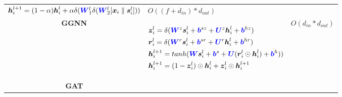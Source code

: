 \begin{table}
\begin{footnotesize}
\begin{tabular}{cp{20em}r}
            $\boldsymbol{h}_i^{l+1} = (1 - \alpha)  \boldsymbol{h}_i^l +\alpha    \delta(\textcolor{blue}{\boldsymbol{W}}^l_1 \delta(\textcolor{blue}{\boldsymbol{W}}^l_2 [\boldsymbol{x}_i \parallel \boldsymbol{s}_i^l]))$ &
            $O((f + d_{in}) * d_{out})$                                                                                                                                                                                        \\
            \textbf{GGNN}    \cite{li2015_ggnn}                                                                                                                                                                              &
            \begin{scriptsize}
                $\begin{aligned}[t]
                         & {\boldsymbol{z}}_i^l = \delta ( \textcolor{blue}{\boldsymbol{W}}^z \boldsymbol{s}_i^l + \textcolor{blue}{\boldsymbol{b}}^{sz} + \textcolor{blue}{\boldsymbol{U}}^z \boldsymbol{h}_i^{l} + \textcolor{blue}{\boldsymbol{b}}^{hz})                    \\
                         & \boldsymbol{r}_i^l = \delta ( \textcolor{blue}{\boldsymbol{W}}^r \boldsymbol{s}_i^l+ \textcolor{blue}{\boldsymbol{b}}^{sr} +\textcolor{blue}{\boldsymbol{U}}^r \boldsymbol{h}_i^{l} + \textcolor{blue}{\boldsymbol{b}}^{hr})                        \\
                         & \boldsymbol{h}_i^{l+1} = tanh ( \textcolor{blue}{\boldsymbol{W}} \boldsymbol{s}_i^l + \textcolor{blue}{\boldsymbol{b}}^s + \textcolor{blue}{\boldsymbol{U}} ( \boldsymbol{r}_i^l \odot \boldsymbol{h}_i^{l}) + \textcolor{blue}{\boldsymbol{b}}^h)) \\
                         & \boldsymbol{h}_i^{l+1} = (1 - {\boldsymbol{z}}_i^l) \odot \boldsymbol{h}_i^l + {\boldsymbol{z}}_i^l \odot \boldsymbol{h}_i^{l+1}
                    \end{aligned}$
            \end{scriptsize}
                                                                                                                                                                                                                             &
            $O(d_{in} * d_{out})$                                                                                                                                                                                              \\
            \textbf{GAT} \cite{huang2018_gat}                                                                                                                                                                                &

\end{tabular}
\end{footnotesize}
\end{table}
